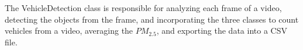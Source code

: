 The VehicleDetection class is responsible for analyzing each frame of a video, detecting the objects from the frame, and incorporating the three classes to count vehicles from a video, averaging the $PM_{2.5}$, and exporting the data into a CSV file.

%
%
%
%
%
%
%
%

